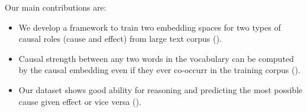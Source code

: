 Our main contributions are:
\begin{itemize}
	\item We develop a framework to train two embedding spaces for
two types of causal roles (cause and effect) from large text corpus 
().
	\item Causal strength between any two words in the vocabulary can be 
computed by the causal embedding even if they ever co-occurr in the 
training corpus (). 
	\item Our dataset shows good ability for reasoning and predicting 
the most possible cause given effect or vice versa ().
\end{itemize}
